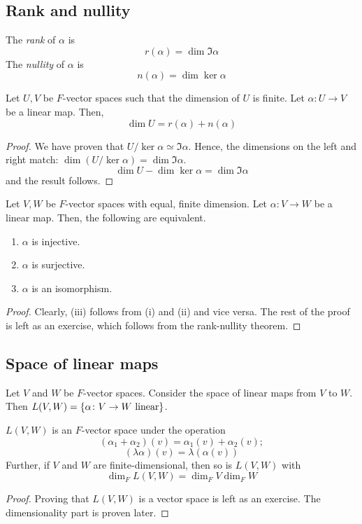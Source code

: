 \subsection{Rank and nullity}
\begin{definition}
	The \textit{rank} of \( \alpha \) is
	\[
		r(\alpha) = \dim\Im \alpha
	\]
	The \textit{nullity} of \( \alpha \) is
	\[
		n(\alpha) = \dim\ker \alpha
	\]
\end{definition}
\begin{theorem}
	Let \( U, V \) be \( F \)-vector spaces such that the dimension of \( U \) is finite.
	Let \( \alpha \colon U \to V \) be a linear map.
	Then,
	\[
		\dim U = r(\alpha) + n(\alpha)
	\]
\end{theorem}
\begin{proof}
	We have proven that \( U / \ker \alpha \simeq \Im \alpha \).
	Hence, the dimensions on the left and right match: \( \dim (U/\ker\alpha) = \dim \Im \alpha \).
	\[
		\dim U - \dim \ker \alpha = \dim \Im \alpha
	\]
	and the result follows.
\end{proof}
\begin{lemma}
	Let \( V, W \) be \( F \)-vector spaces with equal, finite dimension.
	Let \( \alpha \colon V \to W \) be a linear map.
	Then, the following are equivalent.
	\begin{enumerate}
		\item \( \alpha \) is injective.
		\item \( \alpha \) is surjective.
		\item \( \alpha \) is an isomorphism.
	\end{enumerate}
\end{lemma}
\begin{proof}
	Clearly, (iii) follows from (i) and (ii) and vice versa.
	The rest of the proof is left as an exercise, which follows from the rank-nullity theorem.
\end{proof}

\subsection{Space of linear maps}
Let \( V \) and \( W \) be \( F \)-vector spaces.
Consider the space of linear maps from \( V \) to \( W \).
Then \( L(V,W) = \qty{\alpha \colon V \to W \text{ linear}} \).
\begin{proposition}
	\( L(V,W) \) is an \( F \)-vector space under the operation
	\[
		(\alpha_1 + \alpha_2)(v) = \alpha_1(v) + \alpha_2(v);
	\]
	\[
		(\lambda \alpha)(v) = \lambda( \alpha(v) )
	\]
	Further, if \( V \) and \( W \) are finite-dimensional, then so is \( L(V,W) \) with
	\[
		\dim_F L(V,W) = \dim_F V \dim_F W
	\]
\end{proposition}
\begin{proof}
	Proving that \( L(V,W) \) is a vector space is left as an exercise.
	The dimensionality part is proven later.
\end{proof}

